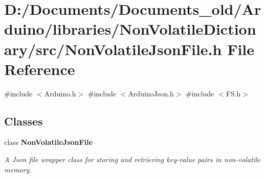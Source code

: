 \section{D\+:/\+Documents/\+Documents\+\_\+old/\+Arduino/libraries/\+Non\+Volatile\+Dictionary/src/\+Non\+Volatile\+Json\+File.h File Reference}
\label{_non_volatile_json_file_8h}
{\ttfamily \#include $<$Arduino.\+h$>$}\newline
{\ttfamily \#include $<$Arduino\+Json.\+h$>$}\newline
{\ttfamily \#include $<$F\+S.\+h$>$}\newline
\subsection*{Classes}
\begin{DoxyCompactItemize}
\item 
class \textbf{ Non\+Volatile\+Json\+File}
\begin{DoxyCompactList}\small\item\em A Json file wrapper class for storing and retrieving key-\/value pairs in non-\/volatile memory. \end{DoxyCompactList}\end{DoxyCompactItemize}
